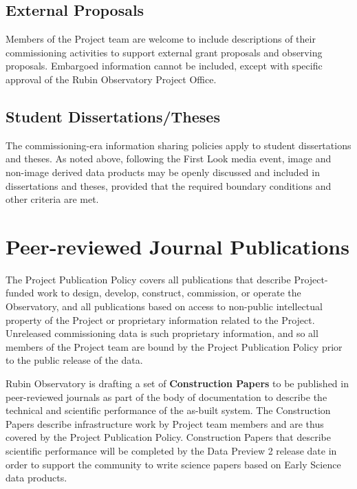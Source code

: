 \documentclass[SE,authoryear,toc]{lsstdoc}
\begin{document}
\subsection{External Proposals}

Members of the Project team are welcome to include descriptions of their commissioning activities to support external grant proposals and observing proposals.
Embargoed information cannot be included, except with specific approval of the Rubin Observatory Project Office.

\subsection{Student Dissertations/Theses}

The commissioning-era information sharing policies apply to student dissertations and theses.
As noted above, following the First Look media event, image and non-image derived data products may be openly discussed and included in dissertations and theses, provided that the required boundary conditions and other criteria are met.

\section{Peer-reviewed Journal Publications}
\label{publications}

The Project Publication Policy  covers all publications that describe Project-funded work to design, develop, construct, commission, or operate the Observatory, and all publications based on access to non-public intellectual property of the Project or proprietary information related to the Project.
Unreleased commissioning data is such proprietary information, and so all members of the Project team are bound by the Project Publication Policy prior to the public release of the data.

Rubin Observatory is drafting a set of \textbf{Construction Papers} to be published in peer-reviewed journals as part of the body of documentation to describe the technical and scientific performance of the as-built system.
The Construction Papers describe infrastructure work by Project team members and are thus covered by the Project Publication Policy.
Construction Papers that describe scientific performance will be completed by the Data Preview 2 release date in order to support the community to write science papers based on Early Science data products.
\end{document}
